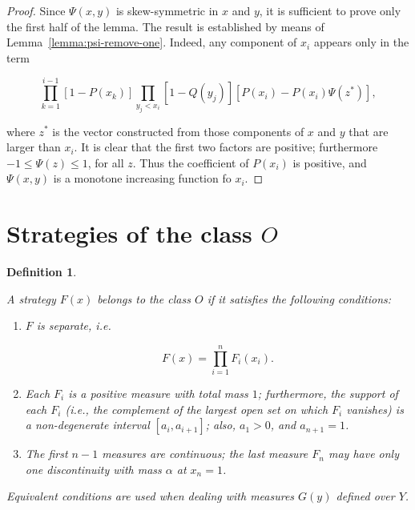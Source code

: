 \documentclass{article}
\newtheorem{definition}{Definition}
\begin{document}
\begin{proof}

Since $\Psi(x, y)$ is skew-symmetric in $x$ and $y$, it is sufficient to prove
only the first half of the lemma. The result is established by means of
Lemma~\ref{lemma:psi-remove-one}. Indeed, any component of $x_i$ appears only
in the term

\[
    \prod_{k=1}^{i-1} [1 - P(x_k)] \prod_{y_j < x_i} [1 - Q(y_j)] [P(x_i) -
P(x_i) \Psi(z^*)],
\]

where $z^*$ is the vector constructed from those components of $x$ and $y$ that
are larger than $x_i$. It is clear that the first two factors are positive;
furthermore $-1 \leq \Psi(z) \leq 1$, for all $z$. Thus the coefficient of
$P(x_i)$ is positive, and $\Psi(x, y)$ is a monotone increasing function fo
$x_i$.

\end{proof}

\section{Strategies of the class $O$}

\begin{definition} \label{defn:class-o}

A strategy $F(x)$ belongs to the class $O$ if it satisfies the following
conditions:

\begin{enumerate}

\item $F$ is separate, i.e.

\[
    F(x) = \prod_{i=1}^n F_i(x_i).
\]

\item Each $F_i$ is a positive measure with total mass $1$; furthermore, the
support of each $F_i$ (i.e., the complement of the largest open set on which
$F_i$ vanishes) is a non-degenerate interval $[a_i, a_{i+1}]$; also, $a_1 > 0$,
and $a_{n+1} = 1$.

\item The first $n-1$ measures are continuous; the last measure $F_n$ may have
only one discontinuity with mass $\alpha$ at $x_n = 1$.

\end{enumerate}

Equivalent conditions are used when dealing with measures $G(y)$ defined over
$Y$.

\end{definition}
\end{document}
